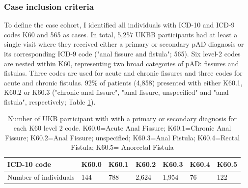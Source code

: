 \subsubsection{Case inclusion criteria}
To define the case cohort, I identified all individuals with ICD-10 and ICD-9 codes K60
and 565 as cases. In total, 5,257 UKBB participants had at least a single visit where they received either a primary or secondary pAD diagnosis or its corresponding ICD-9 code ("anal fissure and fistula"; 565). Six level-2 codes are nested within K60, representing two broad categories of pAD: fissures and fistulas. Three codes are used for acute and chronic fissures and three codes for acute and chronic fistulas. 92\% of patients (4,858) presented with either K60.1, K60.2 or K60.3 ("chronic anal fissure", "anal fissure, unspecified" and "anal fistula", respectively; Table \ref{table:ukbb_level2_nums}).



\begin{table}[H]
  \centering
  \caption{Number of UKB participant with with a primary or secondary diagnosis for each K60 level 2 code. K60.0=Acute Anal Fissure; K60.1=Chronic Anal Fissure; K60.2=Anal Fissure; unspecified; K60.3=Anal Fistula; K60.4=Rectal Fistula; K60.5= Anorectal Fistula}
  \label{table:ukbb_level2_nums}
  \begin{tabular}{|l|l|l|l|l|l|l|}
  \hline
  ICD-10 code           & K60.0  & K60.1  & K60.2  & K60.3 & K60.4 & K60.5\\ \hline
  Number of individuals & 144                      & 788                        & 2,624                           & 1,954              & 76                   & 122                     \\ \hline
  \end{tabular}
  \end{table}




